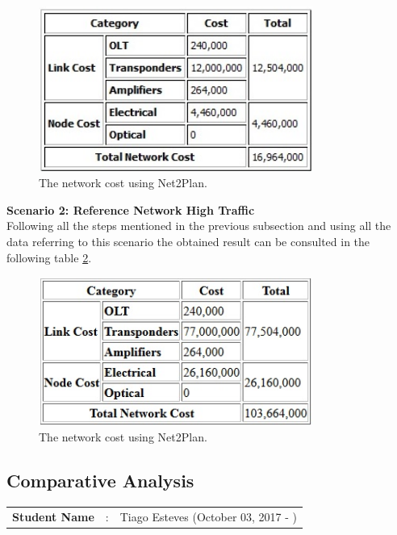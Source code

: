 \begin{figure}[h!]
\centering
\includegraphics[width=9cm]{sdf/opaque/figures/heuristic_opaque_surv_ref_low}
\caption{The network cost using Net2Plan.}
\label{heuristicopaque_surv_ref_low}
\end{figure}


\textbf{Scenario 2: Reference Network High Traffic}\\

Following all the steps mentioned in the previous subsection and using all the data referring to this scenario the obtained result can be consulted in the following table \ref{heuristicopaque_surv_ref_high}.

\begin{figure}[h!]
\centering
\includegraphics[width=9cm]{sdf/opaque/figures/heuristic_opaque_surv_ref_high}
\caption{The network cost using Net2Plan.}
\label{heuristicopaque_surv_ref_high}
\end{figure}


\subsection{Comparative Analysis}
\begin{tcolorbox}	
\begin{tabular}{p{2.75cm} p{0.2cm} p{10.5cm}} 	
\textbf{Student Name}  &:& Tiago Esteves    (October 03, 2017 - )\\
\end{tabular}
\end{tcolorbox}

